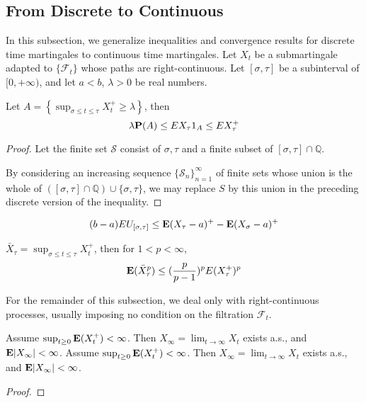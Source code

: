 \subsection{From Discrete to Continuous}
In this subsection, we generalize inequalities and convergence results for discrete time martingales to continuous time martingales.\newline 
Let $X_t$ be a submartingale adapted to $\{\mathcal{F}_t\}$ whose paths are right-continuous. Let $[\sigma,\tau]$ be a subinterval of $[0,+\infty)$,
and let $a<b$, $\lambda>0$ be real numbers.
\begin{theorem}
    Let $A=\left\{ \sup_{\sigma\leq t\leq \tau}X_t^+  \geq\lambda\right\}$, then \[\lambda \mathbf{P}(A)\leq EX_\tau1_A\leq EX_\tau^+\]
\end{theorem}
\begin{proof}
    Let the finite set $\mathcal{S}$ consist of $\sigma,\tau$ and a finite subset of $[\sigma,\tau]\cap \mathbb{Q}$.

    By considering an increasing sequence $\{\mathcal{S}_n\}_{n=1}^\infty$ of finite sets whose union is the whole of $([\sigma,\tau]\cap \mathbb{Q})\cup\{\sigma,\tau\}$,
    we may replace $S$ by this union in the preceding discrete version of the inequality.
\end{proof}

\begin{theorem}
    \[(b-a)EU_{[\sigma,\tau]}\leq \mathbf{E}(X_\tau-a)^+-\mathbf{E}(X_\sigma-a)^+\]
\end{theorem}

\begin{theorem}
    $\bar{X}_\tau= \sup_{\sigma\leq t\leq \tau}X_t^+$, then for $1<p<\infty$, \[\mathbf{E}(\bar{X}_\tau^p)\leq (\frac{p}{p-1})^pE(X_\tau^+)^p\]
\end{theorem}



For the remainder of this subsection, we deal only with right-continuous processes,
usually imposing no condition on the filtration $\mathcal{F}_t$.
\begin{theorem}
    Assume $\sup_{t\geq 0} \mathbf{E}(X_t^+)<\infty$. Then $X_\infty =\lim_{t\to\infty} X_t$ exists a.s., and $\mathbf{E}|X_\infty|<\infty$.
    Assume $\sup_{t\geq 0} \mathbf{E}(X_t^+)<\infty$. Then $X_\infty =\lim_{t\to\infty} X_t$ exists a.s., and $\mathbf{E}|X_\infty|<\infty$.
\end{theorem}
\begin{proof}
    
\end{proof}

